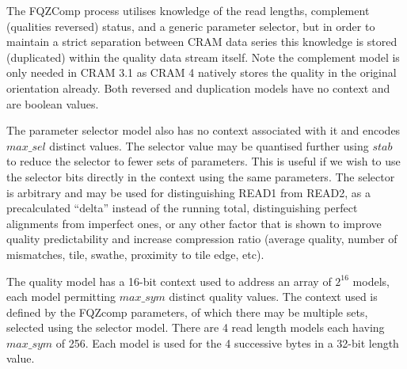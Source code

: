 \documentclass[a4paper]{article}
\begin{document}
The FQZComp process utilises knowledge of the read lengths, complement
(qualities reversed) status, and a generic parameter selector, but in
order to maintain a strict separation between CRAM data series this
knowledge is stored (duplicated) within the quality data stream
itself.  Note the complement model is only needed in CRAM 3.1 as CRAM
4 natively stores the quality in the original orientation already.
Both reversed and duplication models have no context and are boolean
values.

The parameter selector model also has no context associated with it
and encodes $max\_sel$ distinct values.  The selector value may be
quantised further using $stab$ to reduce the selector to fewer
sets of parameters.  This is useful if we wish to use the selector
bits directly in the context using the same parameters.  The selector
is arbitrary and may be used for distinguishing READ1 from READ2, as
a precalculated ``delta'' instead of the running total, distinguishing
perfect alignments from imperfect ones, or any other factor that is
shown to improve quality predictability and increase compression
ratio (average quality, number of mismatches, tile, swathe, proximity
to tile edge, etc).

The quality model has a 16-bit context used to address an array of
$2^{16}$ models, each model permitting $max\_sym$ distinct quality
values.  The context used is defined by the FQZcomp parameters, of
which there may be multiple sets, selected using the selector model.
There are 4 read length models each having $max\_sym$ of 256.  Each
model is used for the 4 successive bytes in a 32-bit length value.
\end{document}
